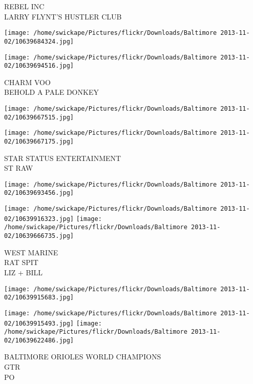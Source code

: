 \documentclass[10pt,letterpaper]{article}
\begin{document}
REBEL INC\\
LARRY FLYNT'S HUSTLER CLUB\\
\pagebreak

\texttt{[image: /home/swickape/Pictures/flickr/Downloads/Baltimore 2013-11-02/10639684324.jpg]}

\vspace{0.25in}
\texttt{[image: /home/swickape/Pictures/flickr/Downloads/Baltimore 2013-11-02/10639694516.jpg]}

CHARM VOO\\
BEHOLD A PALE DONKEY\\
\pagebreak

\texttt{[image: /home/swickape/Pictures/flickr/Downloads/Baltimore 2013-11-02/10639667515.jpg]}

\vspace{0.25in}
\texttt{[image: /home/swickape/Pictures/flickr/Downloads/Baltimore 2013-11-02/10639667175.jpg]}

STAR STATUS ENTERTAINMENT\\
ST RAW\\
\pagebreak

\texttt{[image: /home/swickape/Pictures/flickr/Downloads/Baltimore 2013-11-02/10639693456.jpg]}

\vspace{0.25in}
\texttt{[image: /home/swickape/Pictures/flickr/Downloads/Baltimore 2013-11-02/10639916323.jpg]}
\texttt{[image: /home/swickape/Pictures/flickr/Downloads/Baltimore 2013-11-02/10639666735.jpg]}

WEST MARINE\\
RAT SPIT\\
LIZ + BILL\\
\pagebreak

\texttt{[image: /home/swickape/Pictures/flickr/Downloads/Baltimore 2013-11-02/10639915683.jpg]}

\vspace{0.25in}
\texttt{[image: /home/swickape/Pictures/flickr/Downloads/Baltimore 2013-11-02/10639915493.jpg]}
\texttt{[image: /home/swickape/Pictures/flickr/Downloads/Baltimore 2013-11-02/10639622486.jpg]}

BALTIMORE ORIOLES WORLD CHAMPIONS\\
GTR\\
PO\\
\pagebreak
\end{document}
